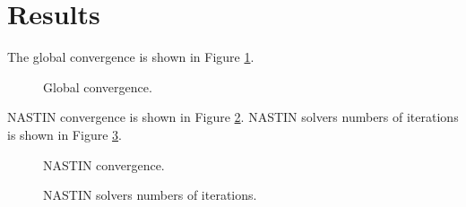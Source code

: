 \documentclass[10pt]{article}
\begin{document}
\section{Results}
The global convergence is shown in Figure \ref{fig:global-convergence}.
\begin{figure}
\centerline{}
\caption{Global convergence.}
\label{fig:global-convergence}
\end{figure}
NASTIN convergence is shown in Figure \ref{fig:NASTIN-convergence}.
NASTIN solvers numbers of iterations is shown in Figure \ref{fig:NASTIN-solver}.
\begin{figure}
\centerline{}
\caption{NASTIN convergence.}
\label{fig:NASTIN-convergence}
\end{figure}
\begin{figure}
\centerline{}
\caption{NASTIN solvers numbers of iterations.}
\label{fig:NASTIN-solver}
\end{figure}
\end{document}
